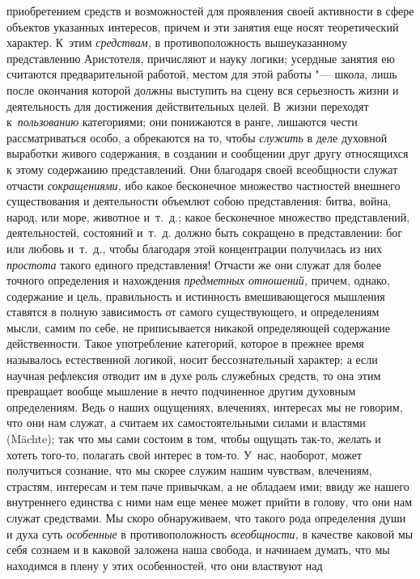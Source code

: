 приобретением средств и возможностей для проявления своей активности в сфере
объектов указанных интересов, причем и эти занятия еще носят теоретический
характер. К~этим {\em средствам,} в противоположность вышеуказанному
представлению Аристотеля, причисляют и науку логики; усердные занятия ею
считаются предварительной работой, местом для этой работы "--- школа, лишь
после окончания которой должны выступить на сцену вся серьезность жизни и
деятельность для достижения действительных целей. В~жизни переходят
к~{\em пользованию} категориями; они понижаются в ранге, лишаются чести
рассматриваться особо, а обрекаются на то, чтобы {\em служить} в деле духовной
выработки живого содержания, в создании и сообщении друг другу относящихся к
этому содержанию представлений. Они благодаря своей всеобщности служат отчасти
{\em сокращениями,} ибо какое бесконечное множество частностей внешнего
существования и деятельности объемлют собою представления: битва, война, народ,
или море, животное и~т.~д.; какое бесконечное множество представлений,
деятельностей, состояний и~т.~д. должно быть сокращено в представлении: бог или
любовь и~т.~д., чтобы благодаря этой концентрации получилась из них
{\em простота} такого единого представления! Отчасти же они служат для более
точного определения и нахождения {\em предметных отношений,} причем, однако,
содержание и цель, правильность и истинность вмешивающегося мышления ставятся в
полную зависимость от самого существующего, и определениям мысли, самим по
себе, не приписывается никакой определяющей содержание действенности. Такое
употребление категорий, которое в прежнее время называлось естественной
логикой, носит бессознательный характер; а если научная рефлексия отводит им в
духе роль служебных средств, то она этим превращает вообще мышление в нечто
подчиненное другим духовным определениям. Ведь о наших ощущениях, влечениях,
интересах мы не говорим, что они нам служат, а считаем их самостоятельными
силами и властями (Mächte); так что мы сами состоим в том, чтобы ощущать
так-то, желать и хотеть того-то, полагать свой интерес в том-то. У~нас,
наоборот, может получиться сознание, что мы скорее служим нашим чувствам,
влечениям, страстям, интересам и тем паче привычкам, а не обладаем ими; ввиду
же нашего внутреннего единства с ними нам еще менее может прийти в голову, что
они нам служат средствами. Мы скоро обнаруживаем, что такого рода определения
души и духа суть {\em особенные} в противоположность {\em всеобщности,} в
качестве каковой мы себя сознаем и в каковой заложена наша свобода, и начинаем
думать, что мы находимся в плену у этих особенностей, что они властвуют над
